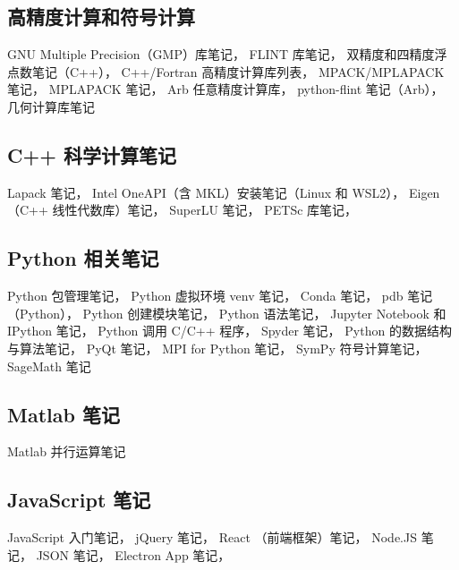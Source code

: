 \subsection{高精度计算和符号计算}
GNU Multiple Precision（GMP）库笔记，
FLINT 库笔记，
双精度和四精度浮点数笔记（C++），
C++/Fortran 高精度计算库列表，
MPACK/MPLAPACK 笔记，
MPLAPACK 笔记，
Arb 任意精度计算库，
python-flint 笔记（Arb），
几何计算库笔记

\subsection{C++ 科学计算笔记}
Lapack 笔记，
Intel OneAPI（含 MKL）安装笔记（Linux 和 WSL2），
Eigen （C++ 线性代数库）笔记，
SuperLU 笔记，
PETSc 库笔记，

\subsection{Python 相关笔记}
Python 包管理笔记，
Python 虚拟环境 venv 笔记，
Conda 笔记，
pdb 笔记（Python），
Python 创建模块笔记，
Python 语法笔记，
Jupyter Notebook 和 IPython 笔记，
Python 调用 C/C++ 程序，
Spyder 笔记，
Python 的数据结构与算法笔记，
PyQt 笔记，
MPI for Python 笔记，
SymPy 符号计算笔记，
SageMath 笔记

\subsection{Matlab 笔记}
Matlab 并行运算笔记

\subsection{JavaScript 笔记}
JavaScript 入门笔记，
jQuery 笔记，
React （前端框架）笔记，
Node.JS 笔记，
JSON 笔记，
Electron App 笔记，
